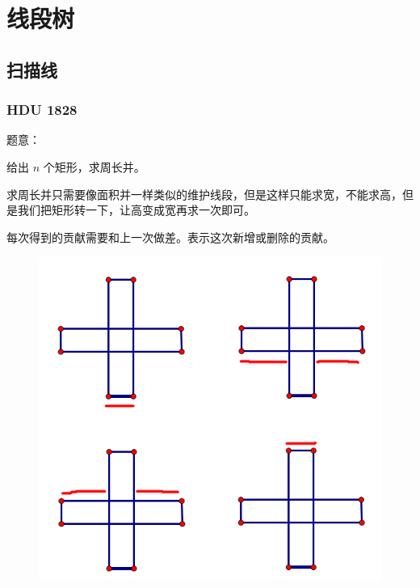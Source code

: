 \section{线段树}
\subsection{扫描线}
\subsubsection{HDU 1828}

题意：\par
给出 $n$ 个矩形，求周长并。\par

求周长并只需要像面积并一样类似的维护线段，但是这样只能求宽，不能求高，但是我们把矩形转一下，让高变成宽再求一次即可。\par
每次得到的贡献需要和上一次做差。表示这次新增或删除的贡献。

\begin{figure}[ht]
\centering  %
\includegraphics[scale=0.50]{./images/scan_line.png} %
\end{figure}

